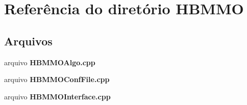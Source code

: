 \section{Referência do diretório H\+B\+M\+MO}
\label{dir_127fcc33e5a06c18908023def1ce915e}
\subsection*{Arquivos}
\begin{DoxyCompactItemize}
\item 
arquivo {\bf H\+B\+M\+M\+O\+Algo.\+cpp}
\item 
arquivo {\bf H\+B\+M\+M\+O\+Conf\+File.\+cpp}
\item 
arquivo {\bf H\+B\+M\+M\+O\+Interface.\+cpp}
\end{DoxyCompactItemize}
